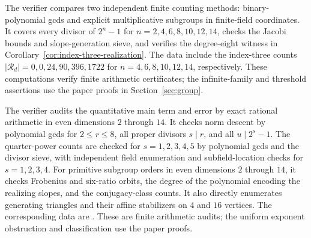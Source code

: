 \documentclass[11pt]{article}
\begin{document}
The verifier  compares two independent
finite counting methods: binary-polynomial gcds and explicit multiplicative
subgroups in finite-field coordinates. It covers every divisor of $2^n-1$
for $n=2,4,6,8,10,12,14$, checks the Jacobi bounds and slope-generation
sieve, and verifies the degree-eight witness in
Corollary~\ref{cor:index-three-realization}. The data
 include the index-three counts
$|\mathcal R_d|=0,0,24,90,396,1722$ for
$n=4,6,8,10,12,14$, respectively. These computations verify finite
arithmetic certificates; the infinite-family and threshold assertions
use the paper proofs in Section~\ref{sec:group}.

The verifier  audits the quantitative
main term and error by exact rational arithmetic in even dimensions
$2$ through $14$. It checks norm descent by polynomial gcds for
$2\le r\le8$, all proper divisors $s\mid r$, and all $u\mid2^s-1$.
The quarter-power counts are checked for $s=1,2,3,4,5$ by polynomial
gcds and the divisor sieve, with independent field enumeration and
subfield-location checks for $s=1,2,3,4$.
For primitive subgroup orders in even dimensions $2$ through $14$,
it checks Frobenius and six-ratio orbits, the degree of the polynomial
encoding the realizing slopes, and the conjugacy-class counts.
It also directly enumerates generating triangles and their affine
stabilizers on $4$ and $16$ vertices. The corresponding data are
. These are finite arithmetic audits;
the uniform exponent obstruction and classification use the paper proofs.
\end{document}
